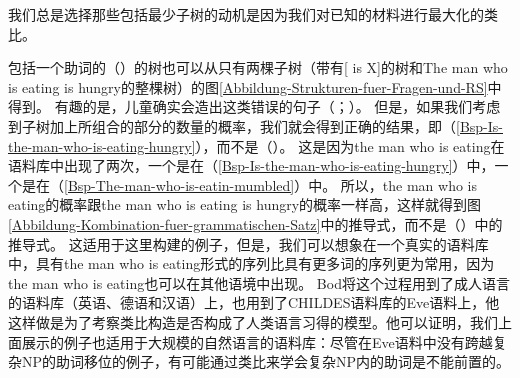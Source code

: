 我们总是选择那些包括最少子树的动机是因为我们对已知的材料进行最大化的类比。

包括一个助词的（）的树也可以从只有两棵子树（带有[ is X]的树和The man who is eating is hungry的整棵树）的图\ref{Abbildung-Strukturen-fuer-Fragen-und-RS}中得到。
\z
有趣的是，儿童确实会造出这类错误的句子（\citealp[]{CN87a-u}；\citealp*{ARP2008a}）。
但是，如果我们考虑到子树加上所组合的部分的数量的概率，我们就会得到正确的结果，即（\ref{Bsp-Is-the-man-who-is-eating-hungry}），而不是（）。
这是因为the man who is eating在语料库中出现了两次，一个是在（\ref{Bsp-Is-the-man-who-is-eating-hungry}）中，一个是在（\ref{Bsp-The-man-who-is-eatin-mumbled}）中。
所以，the man who is eating的概率跟the man who is eating is hungry的概率一样高，这样就得到图\ref{Abbildung-Kombination-fuer-grammatischen-Satz}中的推导式，而不是（）中的推导式。
这适用于这里构建的例子，但是，我们可以想象在一个真实的语料库中，具有the man who is eating形式的序列比具有更多词的序列更为常用，因为the man who is eating也可以在其他语境中出现。
Bod将这个过程用到了成人语言的语料库（英语、德语和汉语）上，也用到了CHILDES语料库的Eve语料上，他这样做是为了考察类比构造是否构成了人类语言习得的模型。他可以证明，我们上面展示的例子也适用于大规模的自然语言的语料库：尽管在Eve语料中没有跨越复杂NP的助词移位的例子，有可能通过类比来学会复杂NP内的助词是不能前置的。
